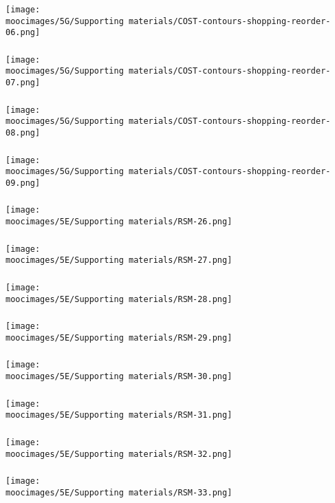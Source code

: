 \documentclass[handout,11pt,aspectratio=169,mathserif]{beamer}
\begin{document}
\begin{frame}\frametitle{}
	\centerline{\texttt{[image: \\moocimages/5G/Supporting materials/COST-contours-shopping-reorder-06.png]}}
\end{frame}
\begin{frame}\frametitle{}
	\centerline{\texttt{[image: \\moocimages/5G/Supporting materials/COST-contours-shopping-reorder-07.png]}}
\end{frame}
\begin{frame}\frametitle{}
	\centerline{\texttt{[image: \\moocimages/5G/Supporting materials/COST-contours-shopping-reorder-08.png]}}
\end{frame}
\begin{frame}\frametitle{}
	\centerline{\texttt{[image: \\moocimages/5G/Supporting materials/COST-contours-shopping-reorder-09.png]}}
\end{frame}
\begin{frame}\frametitle{}
	\centerline{\texttt{[image: \\moocimages/5E/Supporting materials/RSM-26.png]}}
\end{frame}
\begin{frame}\frametitle{}
	\centerline{\texttt{[image: \\moocimages/5E/Supporting materials/RSM-27.png]}}
\end{frame}
\begin{frame}\frametitle{}
	\centerline{\texttt{[image: \\moocimages/5E/Supporting materials/RSM-28.png]}}
\end{frame}
\begin{frame}\frametitle{}
	\centerline{\texttt{[image: \\moocimages/5E/Supporting materials/RSM-29.png]}}
\end{frame}
\begin{frame}\frametitle{}
	\centerline{\texttt{[image: \\moocimages/5E/Supporting materials/RSM-30.png]}}
\end{frame}
\begin{frame}\frametitle{}
	\centerline{\texttt{[image: \\moocimages/5E/Supporting materials/RSM-31.png]}}
\end{frame}
\begin{frame}\frametitle{}
	\centerline{\texttt{[image: \\moocimages/5E/Supporting materials/RSM-32.png]}}
\end{frame}
\begin{frame}\frametitle{}
	\centerline{\texttt{[image: \\moocimages/5E/Supporting materials/RSM-33.png]}}
\end{frame}
\end{document}
